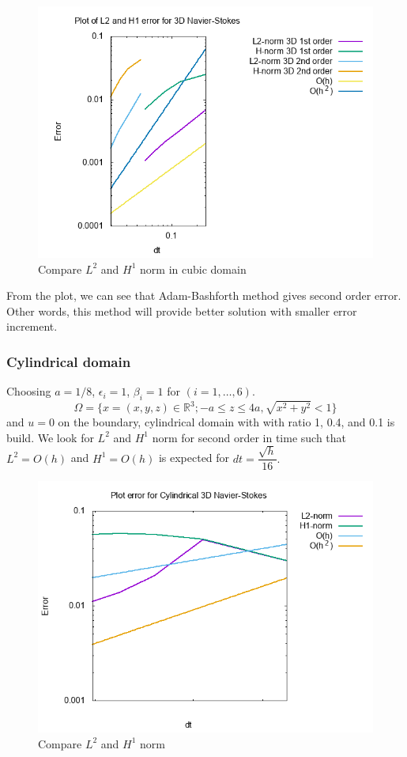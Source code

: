 \documentclass[a4paper]{article}
\newcommand{\R}{\mathbb{R}}
\begin{document}
\begin{figure}[h!]
	\centering
	\includegraphics[width=1\linewidth]{NS_3D/error_NS_3D}
	\caption{Compare $ L^{2} $ and $ H^{1} $ norm in cubic domain}
	\label{fig:errorns3d}
\end{figure}

From the plot, we can see that Adam-Bashforth method gives second order error. Other words, this method will provide better solution with smaller error increment. 

\subsubsection{Cylindrical domain}
Choosing $ a=1/8 $, $ \epsilon_{i}=1 $, $ \beta_{i}=1 $ for $ (i=1, \dots,6) $.
\[ \Omega = \{ x=(x,y,z) \in \R^3 ; -a\leq z \leq 4a, \sqrt{x^2+y^2} < 1 \} \]
and $ u=0 $ on the boundary, cylindrical domain with with ratio 1, 0.4, and 0.1 is build. We look for $ L^{2} $ and $ H^{1} $ norm for second order in time such that $ L^{2} = O(h) $ and $ H^{1} = O(h) $ is expected for $ dt = \dfrac{\sqrt{h}}{16}. $

\begin{figure}[h!]
	\centering
	\includegraphics[width=1\linewidth]{NS_3D/error_cyl}
	\caption{Compare $ L^{2} $ and $ H^{1} $ norm}
	\label{fig:errorcyl}
\end{figure}
\end{document}
